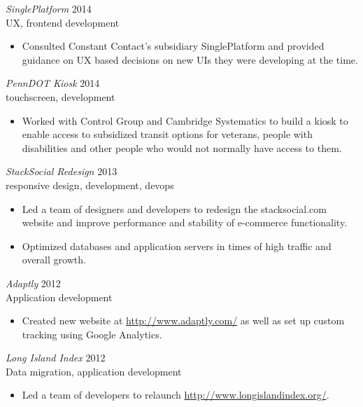 \documentclass[line,margin]{res}
\begin{document}
\begin{resume}
    {\sl SinglePlatform}
    \hfill 2014 \\
    UX, frontend development
    \begin{itemize} \itemsep -2pt
        \item
              Consulted Constant Contact's subsidiary SinglePlatform and provided guidance
              on UX based decisions on new UIs they were developing at the time.
    \end{itemize}

    {\sl PennDOT Kiosk}
    \hfill 2014 \\
    touchscreen, development
    \begin{itemize} \itemsep -2pt
        \item
              Worked with Control Group and Cambridge Systematics to build a kiosk to
              enable access to subsidized transit options for veterans, people with
              disabilities and other people who would not normally have access to them.
    \end{itemize}

    {\sl StackSocial Redesign}
    \hfill 2013 \\
    responsive design, development, devops
    \begin{itemize} \itemsep -2pt
        \item
              Led a team of designers and developers to redesign the stacksocial.com website
              and improve performance and stability of e-commerce functionality.
        \item
              Optimized databases and application servers in times of high traffic and overall
              growth.
    \end{itemize}

    {\sl Adaptly}
    \hfill 2012 \\
    Application development
    \begin{itemize} \itemsep -2pt
        \item
              Created new website at \url{http://www.adaptly.com/} as well as
              set up custom tracking using Google Analytics.

    \end{itemize}

    {\sl Long Island Index}
    \hfill 2012 \\
    Data migration, application development
    \begin{itemize} \itemsep -2pt
        \item
              Led a team of developers to relaunch
              \url{http://www.longislandindex.org/}.


\end{itemize}
\end{resume}
\end{document}
